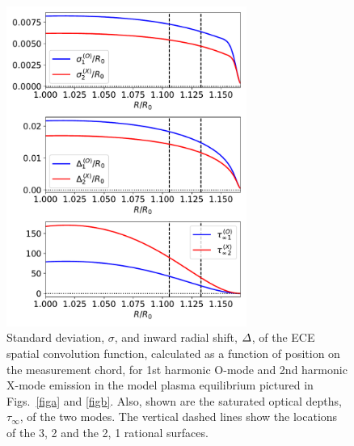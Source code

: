 \documentclass{iopjournal}
\begin{document}
\begin{figure}
\centerline{\includegraphics[width=0.7\textwidth]{Fig15.pdf}}
\caption{Standard deviation, $\sigma$, and inward radial shift, ${\mit\Delta}$, of the ECE spatial convolution function,  calculated as
a function of position on the measurement chord, for 1st harmonic O-mode and 2nd harmonic X-mode emission  in the model plasma equilibrium pictured in Figs.~\ref{figa} and \ref{figb}. Also, shown are the
saturated optical depths, $\tau_\infty$, of the two modes. The vertical dashed lines show the locations of the 3, 2 and the 2, 1 rational surfaces.}\label{fece}
\end{figure}
\end{document}
